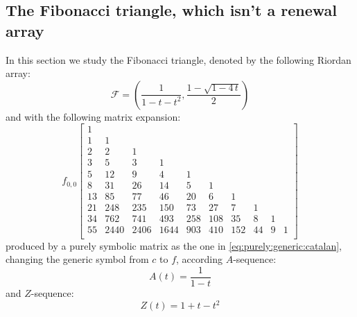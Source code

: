 \subsection{The Fibonacci triangle, which isn't a renewal array}

In this section we study the Fibonacci triangle, denoted by the following
Riordan array:
\begin{displaymath}
    \mathcal{F}=\left(\frac{1}{1-t-t^{2}}, \frac{1-\sqrt{1-4\,t}}{2}\right)
\end{displaymath}
and with the following matrix expansion:
\begin{equation}
f_{0,0}\left[\begin{array}{cccccccccc}
1 &  &  &  &  &  &  &  &  &  \\
1 & 1 &  &  &  &  &  &  &  &  \\
2 & 2 & 1 &  &  &  &  &  &  &  \\
3 & 5 & 3 & 1 &  &  &  &  &  &  \\
5 & 12 & 9 & 4 & 1 &  &  &  &  &  \\
8 & 31 & 26 & 14 & 5 & 1 &  &  &  &  \\
13 & 85 & 77 & 46 & 20 & 6 & 1 &  &  &  \\
21 & 248 & 235 & 150 & 73 & 27 & 7 & 1 &  &  \\
34 & 762 & 741 & 493 & 258 & 108 & 35 & 8 & 1 &  \\
55 & 2440 & 2406 & 1644 & 903 & 410 & 152 & 44 & 9 & 1 \\
\end{array}\right]
\end{equation}
produced by a purely symbolic matrix as the one in \autoref{eq:purely:generic:catalan},
changing the generic symbol from $c$ to $f$, according $A$-sequence:
\begin{displaymath}
    A(t)=\frac{1}{1-t}
\end{displaymath}
and $Z$-sequence:
\begin{displaymath}
    Z(t)=1+t-t^{2}
\end{displaymath}


